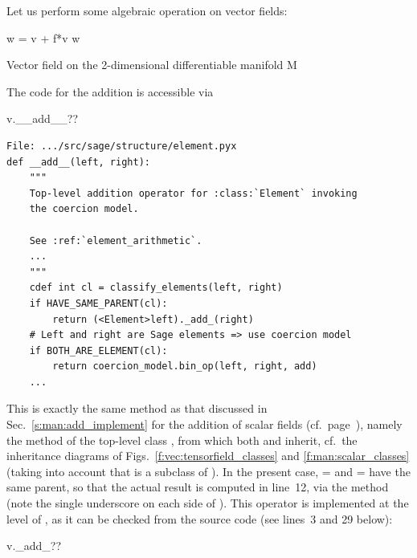 Let us perform some algebraic operation on vector fields:
\begin{NBin}
w = v + f*v
w
\end{NBin}
\begin{NBout}
Vector field on the 2-dimensional differentiable manifold M
\end{NBout}
The code for the addition is accessible via
\begin{NBin}
v.__add__??
\end{NBin}
\begin{lstlisting}
File: .../src/sage/structure/element.pyx
def __add__(left, right):
    """
    Top-level addition operator for :class:`Element` invoking
    the coercion model.

    See :ref:`element_arithmetic`.
    ...
    """
    cdef int cl = classify_elements(left, right)
    if HAVE_SAME_PARENT(cl):
        return (<Element>left)._add_(right)
    # Left and right are Sage elements => use coercion model
    if BOTH_ARE_ELEMENT(cl):
        return coercion_model.bin_op(left, right, add)
    ...
\end{lstlisting}
This is exactly the same method  as that discussed in
Sec.~\ref{s:man:add_implement} for the addition of scalar fields (cf.\ page~\pageref{p:man:list___add__}), namely
the method  of the top-level class , from
which both  and  inherit, cf.\ the inheritance
diagrams of Figs.~\ref{f:vec:tensorfield_classes} and
\ref{f:man:scalar_classes} (taking into account that
 is a subclass of ).
In the present case,  =  and  = 
have the same parent, so that the actual result is computed in line~12,
via the method 
(note the single underscore on each side of ). This operator is
implemented at the level of , as it can be checked from the source code
(see lines~3 and 29 below):
\begin{NBin}
v._add_??
\end{NBin}
